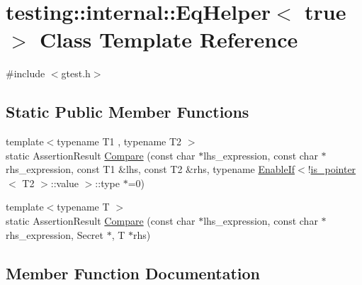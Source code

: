 \hypertarget{classtesting_1_1internal_1_1EqHelper_3_01true_01_4}{}\section{testing\+::internal\+::Eq\+Helper$<$ true $>$ Class Template Reference}
\label{classtesting_1_1internal_1_1EqHelper_3_01true_01_4}


{\ttfamily \#include $<$gtest.\+h$>$}

\subsection*{Static Public Member Functions}
\begin{DoxyCompactItemize}
\item 
{\footnotesize template$<$typename T1 , typename T2 $>$ }\\static Assertion\+Result \mbox{\hyperlink{classtesting_1_1internal_1_1EqHelper_3_01true_01_4_a12c7194b2a210b61f06c912eef484ca6}{Compare}} (const char $\ast$lhs\+\_\+expression, const char $\ast$rhs\+\_\+expression, const T1 \&lhs, const T2 \&rhs, typename \mbox{\hyperlink{structtesting_1_1internal_1_1EnableIf}{Enable\+If}}$<$!\mbox{\hyperlink{structtesting_1_1internal_1_1is__pointer}{is\+\_\+pointer}}$<$ T2 $>$\+::value $>$\+::type $\ast$=0)
\item 
{\footnotesize template$<$typename T $>$ }\\static Assertion\+Result \mbox{\hyperlink{classtesting_1_1internal_1_1EqHelper_3_01true_01_4_a6f292601a68c8f0d49e6d48bd309b900}{Compare}} (const char $\ast$lhs\+\_\+expression, const char $\ast$rhs\+\_\+expression, Secret $\ast$, T $\ast$rhs)
\end{DoxyCompactItemize}


\subsection{Member Function Documentation}
\mbox{\label{classtesting_1_1internal_1_1EqHelper_3_01true_01_4_a12c7194b2a210b61f06c912eef484ca6}} 
